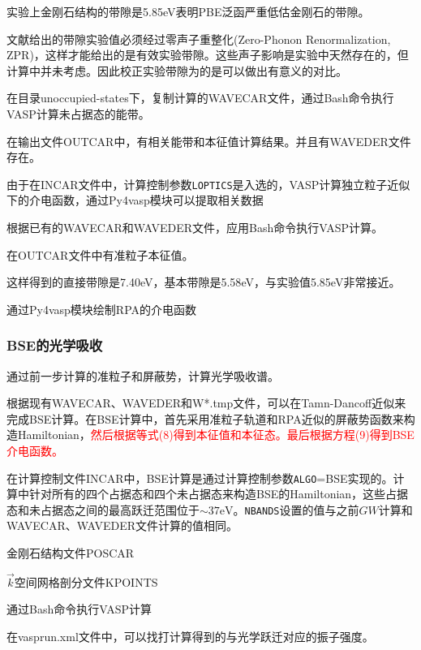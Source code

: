 实验上金刚石结构的带隙是5.85\textrm{eV}表明\textrm{PBE}泛函严重低估金刚石的带隙。

文献给出的带隙实验值必须经过零声子重整化\textrm{(Zero-Phonon Renormalization, ZPR)}，这样才能给出的是有效实验带隙。这些声子影响是实验中天然存在的，但计算中并未考虑。因此校正实验带隙为的是可以做出有意义的对比。

在目录\textrm{unoccupied-states}下，复制计算的\textrm{WAVECAR}文件，通过\textrm{Bash}命令执行\textrm{VASP}计算未占据态的能带。

在输出文件\textrm{OUTCAR}中，有相关能带和本征值计算结果。并且有\textrm{WAVEDER}文件存在。

由于在\textrm{INCAR}文件中，计算控制参数\texttt{LOPTICS}是入选的，\textrm{VASP}计算独立粒子近似下的介电函数，通过\textrm{Py4vasp}模块可以提取相关数据

根据已有的\textrm{WAVECAR}和\textrm{WAVEDER}文件，应用\textrm{Bash}命令执行\textrm{VASP}计算。

在\textrm{OUTCAR}文件中有准粒子本征值。

这样得到的直接带隙是7.40\textrm{eV}，基本带隙是5.58\textrm{eV}，与实验值5.85\textrm{eV}非常接近。

通过\textrm{Py4vasp}模块绘制\textrm{RPA}的介电函数

\subsubsection{\rm{BSE}的光学吸收}
通过前一步计算的准粒子和屏蔽势，计算光学吸收谱。

根据现有\textrm{WAVECAR}、\textrm{WAVEDER}和\textrm{W*.tmp}文件，可以在\textrm{Tamn-Dancoff}近似来完成\textrm{BSE}计算。在\textrm{BSE}计算中，首先采用准粒子轨道和\textrm{RPA}近似的屏蔽势函数来构造\textrm{Hamiltonian}，\textcolor{red}{然后根据等式(8)得到本征值和本征态。最后根据方程(9)得到\textrm{BSE}介电函数。}

在计算控制文件\textrm{INCAR}中，\textrm{BSE}计算是通过计算控制参数\texttt{ALGO}=\textrm{BSE}实现的。计算中针对所有的四个占据态和四个未占据态来构造\textrm{BSE}的\textrm{Hamiltonian}，这些占据态和未占据态之间的最高跃迁范围位于$\sim37\mathrm{eV}$。\texttt{NBANDS}设置的值与之前$GW$计算和\textrm{WAVECAR}、\textrm{WAVEDER}文件计算的值相同。

金刚石结构文件\textrm{POSCAR}

$\vec k$空间网格剖分文件\textrm{KPOINTS}

通过\textrm{Bash}命令执行\textrm{VASP}计算

在\textrm{vasprun.xml}文件中，可以找打计算得到的与光学跃迁对应的振子强度。

